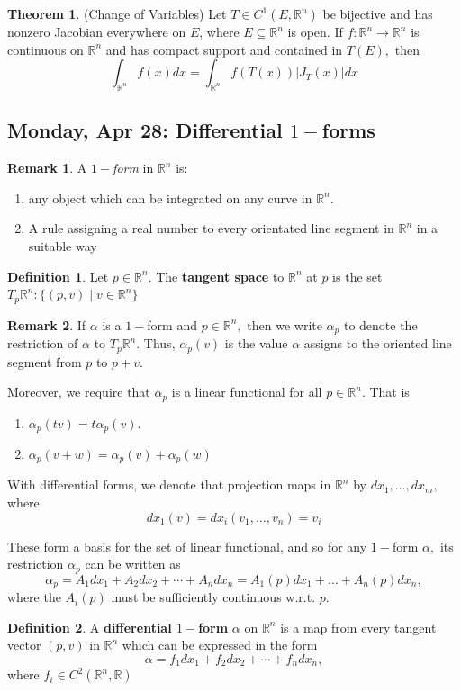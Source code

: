 \documentclass[10pt, oneside]{article}
\newcommand{\bbR}{\mathbb{R}}
\theoremstyle{definition}
\newtheorem{thm}{Theorem}
\newtheorem{defn}{Definition}
\newtheorem{rem}{Remark}
\begin{document}
\begin{thm}
    (Change of Variables) Let $T \in C^1(E, \bbR^n)$ be bijective and has nonzero Jacobian everywhere on $E$, where $E \subseteq \bbR^n$ is open. If $f: \bbR^n \to \bbR^n$ is continuous on $\bbR^n$ and has compact support and contained in $T(E),$ then 
    \[\int_{\bbR^n} f(x)dx = \int_{\bbR^n} f(T(x)) |J_T(x)|dx \]
\end{thm}

\newpage
\subsection{Monday, Apr 28: Differential $1-$forms}
\begin{rem}
    A \textit{$1-$form} in $\bbR^n$ is:
    \begin{enumerate}
        \item any object which can be integrated on any curve in $\bbR^n.$ 
        \item A rule assigning a real number to every orientated line segment in $\bbR^n$ in a suitable way
    \end{enumerate}
\end{rem}
\begin{defn}
    Let $p \in \bbR^n.$ The \textbf{tangent space} to $\bbR^n$ at $p$ is the set $T_p\bbR^n: \{(p,v) \mid v\in \bbR^n\}$ 
\end{defn}
\begin{rem}
    If $\alpha$ is a $1-$form and $p \in \bbR^n,$ then we write $\alpha_p$ to denote the restriction of $\alpha$ to $T_p\bbR^n$. Thus, $\alpha_p(v)$ is the value $\alpha$ assigns to the oriented line segment from $p$ to $p + v.$ 

    Moreover, we require that $\alpha_p$ is a linear functional for all $p \in \bbR^n$. That is 
    \begin{enumerate}
        \item $\alpha_p(tv) = t\alpha_p(v)$.
        \item $\alpha_p(v + w) = \alpha_p(v) + \alpha_p(w)$
    \end{enumerate}

    With differential forms, we denote that projection maps in $\bbR^n$ by $dx_1, \dots, dx_m,$ where 
    \[dx_1(v) = dx_i(v_1, \dots, v_n) = v_i\]

    These form a basis for the set of linear functional, and so for any $1-$form $\alpha,$ its restriction $\alpha_p$ can be written as 
    \[\alpha_p = A_1dx_1 + A_2 dx_2 + \cdots + A_ndx_n = A_1(p)dx_1 + \dots + A_n(p)dx_n,\] where the $A_i(p)$ must be sufficiently continuous w.r.t. $p.$
\end{rem}
\begin{defn}
    A \textbf{differential $1-$form} $\alpha$ on $\bbR^n$ is a map from every tangent vector $(p,v)$ in $\bbR^n$ which can be expressed in the form 
    \[\alpha = f_1 dx_1 + f_2 dx_2 + \cdots  + f_ndx_n,\] where $f_i\in C^2(\bbR^n, \bbR)$
\end{defn}
\end{document}
